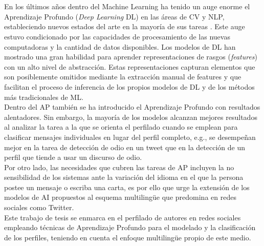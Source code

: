 \\
\\
En los últimos años dentro del Machine Learning ha tenido un auge enorme el Aprendizaje Profundo (\textit{Deep Learning} DL) en las áreas de CV y NLP, estableciendo nuevos estados del arte en la mayoría de sus tareas \citep{electronics8030292}. Este auge estuvo condicionado por las capacidades de procesamiento de las nuevas computadoras y la cantidad de datos disponibles. Los modelos de DL han mostrado una gran habilidad para aprender representaciones de rasgos (\textit{features}) con un alto nivel de abstracción. Estas representaciones capturan elementos que son posiblemente omitidos mediante la extracción manual de features y que facilitan el proceso de inferencia de los propios modelos de DL y de los métodos más tradicionales de ML. 
\\
Dentro del AP también se ha introducido el Aprendizaje Profundo con resultados alentadores. Sin embargo, la mayoría de los modelos alcanzan mejores resultados al analizar la tarea a la que se orienta el perfilado cuando se emplean para clasificar mensajes individuales en lugar del perfil completo, e.g., se desempeñan mejor en la tarea de detección de odio en un tweet que en la detección de un perfil que tiende a usar un discurso de odio. 
\\
Por otro lado, las necesidades que cubren las tareas de AP incluyen la no sensibilidad de los sistemas ante la variación del idioma en el que la persona postee un mensaje o escriba una carta, es por ello que urge la extensión de los modelos de AI propuestos al esquema multilingüe que predomina en redes sociales como Twitter. \\Este trabajo de tesis se enmarca en el perfilado de autores en redes sociales empleando técnicas de Aprendizaje Profundo para el modelado y la clasificación de los perfiles, teniendo en cuenta el enfoque multilingüe propio de este medio. 

